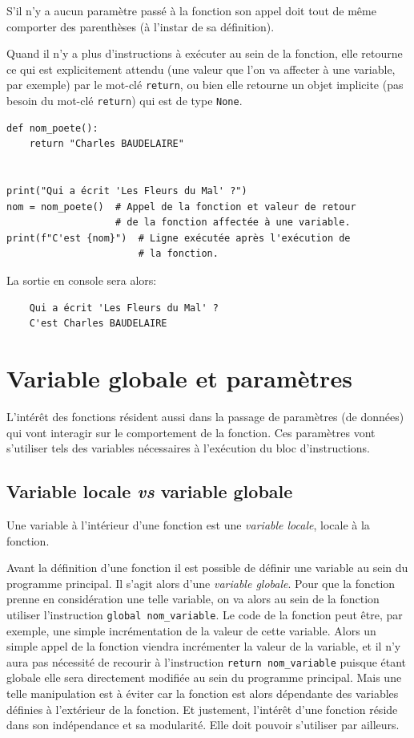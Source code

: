 \documentclass[a4paper,11pt]{book}
\begin{document}
S'il n'y a aucun paramètre passé à la fonction son appel doit tout de même comporter des parenthèses (à l'instar de sa définition).
\medskip

Quand il n'y a plus d'instructions à exécuter au sein de la fonction, elle retourne ce qui est explicitement attendu (une valeur que l'on va affecter à une variable, par exemple) par le mot-clé \texttt{return}, ou bien elle retourne un objet implicite (pas besoin du mot-clé \texttt{return}) qui est de type \texttt{None}.
\begin{lstlisting}[caption=Exemple du fonctionnement d'une fonction]
def nom_poete():
    return "Charles BAUDELAIRE"


print("Qui a écrit 'Les Fleurs du Mal' ?")
nom = nom_poete()  # Appel de la fonction et valeur de retour
                   # de la fonction affectée à une variable.
print(f"C'est {nom}")  # Ligne exécutée après l'exécution de  
                       # la fonction.
\end{lstlisting}
\medskip

La sortie en console sera alors:
\begin{verbatim}
    Qui a écrit 'Les Fleurs du Mal' ?
    C'est Charles BAUDELAIRE
\end{verbatim}
\medskip

\section{Variable globale et paramètres}
L'intérêt des fonctions résident aussi dans la passage de paramètres (de données) qui vont interagir sur le comportement de la fonction. Ces paramètres vont s'utiliser tels des variables nécessaires à l'exécution du bloc d'instructions.
\medskip

\subsection*{Variable locale \textit{vs} variable globale}
Une variable à l'intérieur d'une fonction est une \textit{variable locale}, locale à la fonction.
\medskip

Avant la définition d'une fonction il est possible de définir une variable au sein du programme principal. Il s'agit alors d'une \textit{variable globale}. Pour que la fonction prenne en considération une telle variable, on va alors au sein de la fonction utiliser l'instruction \texttt{global nom\_variable}. Le code de la fonction peut être, par exemple, une simple incrémentation de la valeur de cette variable. Alors un simple appel de la fonction viendra incrémenter la valeur de la variable, et il n'y aura pas nécessité de recourir à l'instruction \texttt{return nom\_variable} puisque étant globale elle sera directement modifiée au sein du programme principal. Mais une telle manipulation est à éviter car la fonction est alors dépendante des variables définies à l'extérieur de la fonction. Et justement, l'intérêt d'une fonction réside dans son indépendance et sa modularité. Elle doit pouvoir s'utiliser par ailleurs.
\medskip
\end{document}
